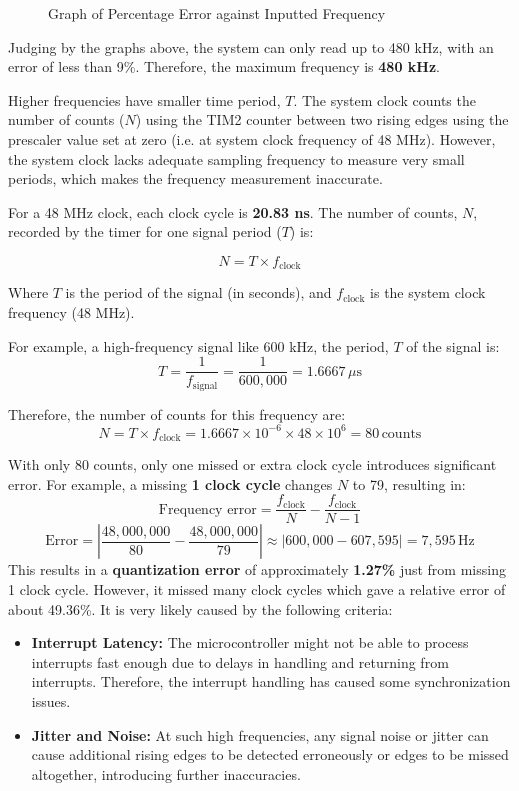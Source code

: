 \begin{figure}[H]
    \centering
    
    \caption{Graph of Percentage Error against Inputted Frequency}
    \label{fig:error_graph}
\end{figure}

Judging by the graphs above, the system can only read up to 480 kHz, with an error of less than 9\%. Therefore, the maximum frequency is \textbf{480 kHz}.

Higher frequencies have smaller time period, $T$. The system clock counts the number of counts ($N$) using the TIM2 counter between two rising edges using the prescaler value set at zero (i.e. at system clock frequency of 48 MHz).  However, the system clock lacks adequate sampling frequency to measure very small periods, which makes the frequency measurement inaccurate.

For a 48 MHz clock, each clock cycle is \textbf{20.83 ns}. The number of counts, \( N \), recorded by the timer for one signal period ($T$) is:

\begin{equation}\label{number_of_counts}
    N = T \times f_{\text{clock}}
\end{equation}

Where $T$ is the period of the signal (in seconds), and $f_{\text{clock}}$ is the system clock frequency (48 MHz).

For example, a high-frequency signal like 600 kHz, the period, $T$ of the signal is:
$$T = \frac{1}{f_{\text{signal}}} = \frac{1}{600,000} = 1.6667 \, \mu\text{s}$$

Therefore, the number of counts for this frequency are:
$$N = T \times f_{\text{clock}} = 1.6667 \times 10^{-6} \times 48 \times 10^6 = 80 \, \text{counts}$$

With only 80 counts, only one missed or extra clock cycle introduces significant error. For example, a missing \textbf{1 clock cycle} changes $N$ to 79, resulting in:
    \[
    \text{Frequency error} = \frac{f_{\text{clock}}}{N} - \frac{f_{\text{clock}}}{N-1}
    \]
    \[
    \text{Error} = \left|\frac{48,000,000}{80} - \frac{48,000,000}{79}\right| \approx \left|600,000 - 607,595\right| = 7,595 \, \text{Hz}
    \]
This results in a \textbf{quantization error} of approximately \textbf{1.27\%} just from missing 1 clock cycle. However, it missed many clock cycles which gave a relative error of about 49.36\%. It is very likely caused by the following criteria:

\begin{itemize}[leftmargin=2em]
    \item  \textbf{Interrupt Latency:} The microcontroller might not be able to process interrupts fast enough due to delays in handling and returning from interrupts. Therefore, the interrupt handling has caused some synchronization issues.
    \item \textbf{Jitter and Noise:} At such high frequencies, any signal noise or jitter can cause additional rising edges to be detected erroneously or edges to be missed altogether, introducing further inaccuracies.
\end{itemize}

